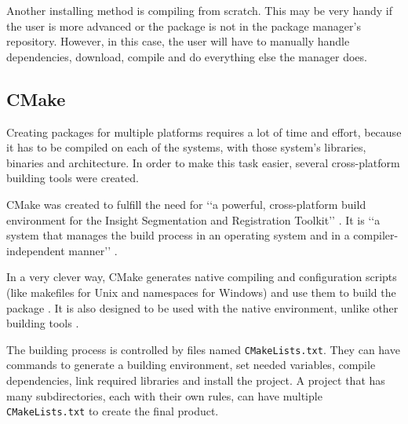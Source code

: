 Another installing method is compiling from scratch. This may be very handy if the user is more advanced or the package is not in the package manager's repository. However, in this case, the user will have to manually handle dependencies, download, compile and do everything else the manager does.

\subsection{CMake}
\label {sec:cmake}

Creating packages for multiple platforms requires a lot of time and effort, because it has to be compiled on each of the systems, with those system's libraries, binaries and architecture. In order to make this task easier, several cross-platform building tools were created.

CMake was created to fulfill the need for \lq\lq a powerful, cross-platform build environment for the Insight Segmentation and Registration Toolkit\rq\rq{} \cite{cmake2017overview}. It is \lq\lq a system that manages the build process in an operating system and in a compiler-independent manner\rq\rq{} \cite{cmake2017overview}.

In a very clever way, CMake generates native compiling and configuration scripts (like makefiles for Unix and namespaces for Windows) and use them to build the package \cite{cmake2017overview}. It is also designed to be used with the native environment, unlike other building tools \cite{cmake2017overview}.

The building process is controlled by files named \texttt{CMakeLists.txt}. They can have commands to generate a building environment, set needed variables, compile dependencies, link required libraries and install the project. A project that has many subdirectories, each with their own rules, can have multiple \texttt{CMakeLists.txt} to create the final product.
